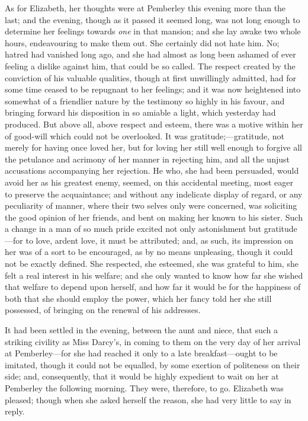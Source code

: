As for Elizabeth, her thoughts were at Pemberley this evening more than the last; and the evening, though as it passed it seemed long, was not long enough to determine her feelings towards \textit{one} in that mansion; and she lay awake two whole hours, endeavouring to make them out. She certainly did not hate him. No; hatred had vanished long ago, and she had almost as long been ashamed of ever feeling a dislike against him, that could be so called. The respect created by the conviction of his valuable qualities, though at first unwillingly admitted, had for some time ceased to be repugnant to her feelings; and it was now heightened into somewhat of a friendlier nature by the testimony so highly in his favour, and bringing forward his disposition in so amiable a light, which yesterday had produced. But above all, above respect and esteem, there was a motive within her of good-will which could not be overlooked. It was gratitude;---gratitude, not merely for having once loved her, but for loving her still well enough to forgive all the petulance and acrimony of her manner in rejecting him, and all the unjust accusations accompanying her rejection. He who, she had been persuaded, would avoid her as his greatest enemy, seemed, on this accidental meeting, most eager to preserve the acquaintance; and without any indelicate display of regard, or any peculiarity of manner, where their two selves only were concerned, was soliciting the good opinion of her friends, and bent on making her known to his sister. Such a change in a man of so much pride excited not only astonishment but gratitude---for to love, ardent love, it must be attributed; and, as such, its impression on her was of a sort to be encouraged, as by no means unpleasing, though it could not be exactly defined. She respected, she esteemed, she was grateful to him, she felt a real interest in his welfare; and she only wanted to know how far she wished that welfare to depend upon herself, and how far it would be for the happiness of both that she should employ the power, which her fancy told her she still possessed, of bringing on the renewal of his addresses.

It had been settled in the evening, between the aunt and niece, that such a striking civility as Miss Darcy's, in coming to them on the very day of her arrival at Pemberley---for she had reached it only to a late breakfast---ought to be imitated, though it could not be equalled, by some exertion of politeness on their side; and, consequently, that it would be highly expedient to wait on her at Pemberley the following morning. They were, therefore, to go. Elizabeth was pleased; though when she asked herself the reason, she had very little to say in reply.

